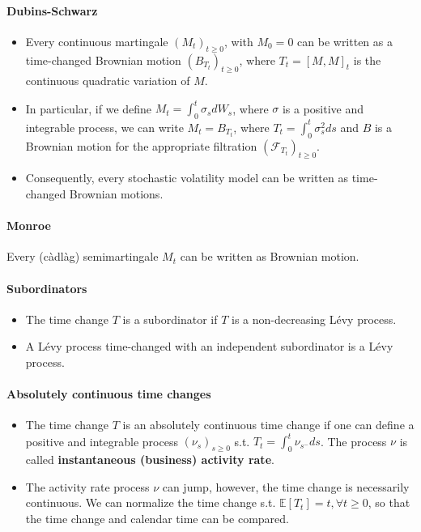 \documentclass[a4paper,landscape,7pt,fleqn]{scrartcl}
\renewcommand{\emph}[1]{\textbf{#1}}
\begin{document}
\begin{multicols*}{3}
\paragraph{Dubins-Schwarz}
\begin{itemize}
\item Every continuous martingale $(M_t)_{t \geq 0}$, with $M_0 = 0$ can be written as a time-changed Brownian motion $(B_{T_t})_{t \geq 0}$, where $T_t = [M, M]_t$ is the continuous quadratic variation of $M$.
\item In particular, if we define $M_t = \int_0^t \sigma_s dW_s$, where $\sigma$ is a positive and integrable process, we can write $M_t = B_{T_t}$, where $T_t = \int_0^t \sigma_s^2 ds$ and $B$ is a Brownian motion for the appropriate filtration $(\mathcal{F}_{T_t})_{t \geq 0}$.
\item Consequently, every stochastic volatility model can be written as time-changed Brownian motions.
\end{itemize}

\paragraph{Monroe}
Every (càdlàg) semimartingale $M_t$ can be written as Brownian motion.

\paragraph{Subordinators}
\begin{itemize}
\item The time change $T$ is a subordinator if $T$ is a non-decreasing Lévy process.
\item A Lévy process time-changed with an independent subordinator is a Lévy process.
\end{itemize}

\paragraph{Absolutely continuous time changes}
\begin{itemize}
\item The time change $T$ is an absolutely continuous time change if one can define a positive and integrable process $(\nu_s)_{s \geq 0}$ s.t. $T_t = \int_0^t \nu_{s^-} ds$. The process $\nu$ is called \emph{instantaneous (business) activity rate}.
\item The activity rate process $\nu$ can jump, however, the time change is necessarily continuous. We can normalize the time change s.t. $\mathbb{E}[T_t] = t, \forall t \geq 0$, so that the time change and calendar time can be compared.
\end{itemize}


\end{multicols*}
\end{document}
